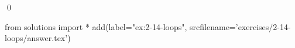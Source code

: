 
\begin{ex}
  \label{ex:2-14-loops}
  
  \qed
\end{ex}
\begin{python0}
from solutions import *
add(label="ex:2-14-loops",
    srcfilename='exercises/2-14-loops/answer.tex')
\end{python0}
